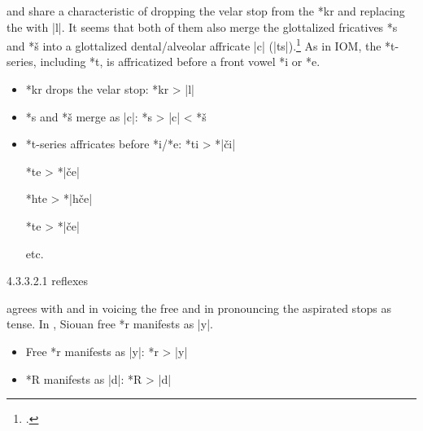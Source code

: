 \documentclass[output=paper]{LSP/langsci}
\begin{document}

 and  share a characteristic of dropping the velar stop from the *kr  and replacing the  with |l|.  It seems that both of them also merge the glottalized fricatives *s\textsuperscript{} and *š\textsuperscript{} into a glottalized dental/alveolar affricate |c\textsuperscript{}| (|ts\textsuperscript{}|).\footnote{\citealt[856]{Rankinetal2006PDF}.} As in IOM, the *t-series, including *t\textsuperscript{}, is affricatized before a front vowel *i or *e.  

\begin{itemize}
\item *kr drops the velar stop: \hspace{3em} *kr	>	|l|
\item *s\textsuperscript{} and *š\textsuperscript{} merge as |c\textsuperscript{}|: \hspace{3em} *s\textsuperscript{}	>	|c\textsuperscript{}|	<	*š\textsuperscript{}

\item *t-series affricates before *i/*e: \hspace{1em} *ti	>	*|\v{c}i|

\hspace{14em} *te	>	*|\v{c}e|

\hspace{14em} *hte	>	*|h\v{c}e|

\hspace{14em} *t\textsuperscript{}e	>	*|\v{c}\textsuperscript{}e|

\hspace{14em} etc.
\end{itemize}

4.3.3.2.1   reflexes
\vspace{1em}

 agrees with  and  in voicing the free  and in pronouncing the aspirated stops as tense.  In , Siouan free *r manifests as |y|.

\begin{itemize}
\item Free *r manifests as |y|: \hspace{1em} *r	>	|y|
\item *R manifests as |d|: \hspace{3em} *R	>	|d|
\end{itemize}
\end{document}
